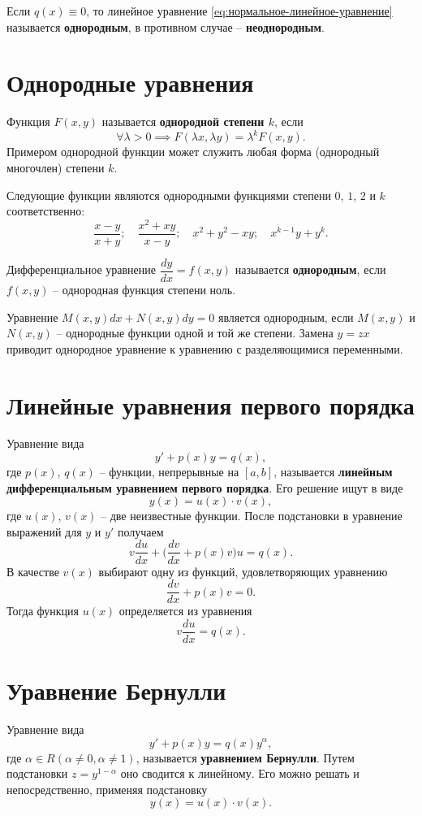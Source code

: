 \documentclass[a5paper, 11pt]{extbook}
\theoremstyle{definition}
\theoremstyle{definition}
\theoremstyle{definition}
\begin{document}
Если \(q(x) \equiv 0\), то линейное уравнение \eqref{eq:нормальное-линейное-уравнение} называется \textbf{однородным}, в противном случае -- \textbf{неоднородным}.

\section{Однородные уравнения}

Функция \(F(x, y)\) называется \textbf{однородной степени \(k\)}, если
\[
    \forall \lambda > 0 \implies F(\lambda x, \lambda y) = \lambda^k F(x, y).
\]
Примером однородной функции может служить любая форма (однородный многочлен) степени \(k\).

Следующие функции являются однородными функциями степени \(0\), \(1\), \(2\) и \(k\) соответственно:
\[
    \frac{x - y}{x + y};
    \quad
    \frac{x^2 + xy}{x - y};
    \quad
    x^2 + y^2 - xy;
    \quad
    x^{k - 1}y + y^k.
\]

Дифференциальное уравнение \(\dfrac{dy}{dx} = f(x, y)\) называется \textbf{однородным}, если \(f(x, y)\) -- однородная функция степени ноль.

Уравнение \(M(x, y)dx + N(x, y)dy = 0\) является однородным, если \(M(x, y)\) и \(N(x, y)\) -- однородные функции одной и той же степени. Замена \(y = zx\) приводит однородное уравнение к уравнению с разделяющимися переменными.

\section{Линейные уравнения первого порядка}

Уравнение вида
\[
    y' + p(x)y = q(x),
\]
где \(p(x)\), \(q(x)\) -- функции, непрерывные на \([a, b]\), называется \textbf{линейным дифференциальным уравнением первого порядка}. Его решение ищут в виде
\[
    y(x) = u(x) \cdot v(x),
\]
где \(u(x)\), \(v(x)\) -- две неизвестные функции. После подстановки в уравнение выражений для \(y\) и \(y'\) получаем
\[
    v \frac{du}{dx} + \Big( \frac{dv}{dx} + p(x)v \Big) u = q(x).
\]
В качестве \(v(x)\) выбирают одну из функций, удовлетворяющих уравнению
\[
    \frac{dv}{dx} + p(x)v = 0.
\]
Тогда функция \(u(x)\) определяется из уравнения
\[
    v \frac{du}{dx} = q(x).
\]

\section{Уравнение Бернулли}

Уравнение вида
\[
    y' + p(x)y = q(x)y^\alpha,
\]
где \(\alpha \in R (\alpha \neq 0, \alpha \neq 1)\), называется \textbf{уравнением Бернулли}. Путем подстановки \(z = y^{1 - \alpha}\) оно сводится к линейному. Его можно решать и непосредственно, применяя подстановку
\[
    y(x) = u(x) \cdot v(x).
\]
\end{document}
